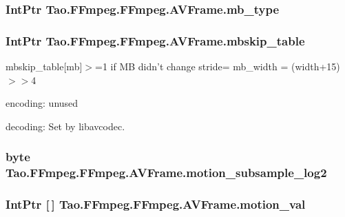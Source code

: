 \hypertarget{struct_tao_1_1_f_fmpeg_1_1_f_fmpeg_1_1_a_v_frame_a3cbf839d220e4c2fbdbe0400ad34c182}{
\subsubsection[{mb\_\-type}]{\setlength{\rightskip}{0pt plus 5cm}IntPtr {\bf Tao.FFmpeg.FFmpeg.AVFrame.mb\_\-type}}}
\label{struct_tao_1_1_f_fmpeg_1_1_f_fmpeg_1_1_a_v_frame_a3cbf839d220e4c2fbdbe0400ad34c182}
\hypertarget{struct_tao_1_1_f_fmpeg_1_1_f_fmpeg_1_1_a_v_frame_acff72d0cc65f263a4840f51cf28e6499}{
\subsubsection[{mbskip\_\-table}]{\setlength{\rightskip}{0pt plus 5cm}IntPtr {\bf Tao.FFmpeg.FFmpeg.AVFrame.mbskip\_\-table}}}
\label{struct_tao_1_1_f_fmpeg_1_1_f_fmpeg_1_1_a_v_frame_acff72d0cc65f263a4840f51cf28e6499}
mbskip\_\-table\mbox{[}mb\mbox{]}$>$=1 if MB didn't change stride= mb\_\-width = (width+15)$>$$>$4
\begin{DoxyItemize}
\item encoding: unused
\item decoding: Set by libavcodec. 
\end{DoxyItemize}\hypertarget{struct_tao_1_1_f_fmpeg_1_1_f_fmpeg_1_1_a_v_frame_aff7134ee6d609c50165689bf45834619}{
\subsubsection[{motion\_\-subsample\_\-log2}]{\setlength{\rightskip}{0pt plus 5cm}byte {\bf Tao.FFmpeg.FFmpeg.AVFrame.motion\_\-subsample\_\-log2}}}
\label{struct_tao_1_1_f_fmpeg_1_1_f_fmpeg_1_1_a_v_frame_aff7134ee6d609c50165689bf45834619}
\hypertarget{struct_tao_1_1_f_fmpeg_1_1_f_fmpeg_1_1_a_v_frame_a3030302698ee47779adfa2114fcb952c}{
\subsubsection[{motion\_\-val}]{\setlength{\rightskip}{0pt plus 5cm}IntPtr \mbox{[}$\,$\mbox{]} {\bf Tao.FFmpeg.FFmpeg.AVFrame.motion\_\-val}}}
\label{struct_tao_1_1_f_fmpeg_1_1_f_fmpeg_1_1_a_v_frame_a3030302698ee47779adfa2114fcb952c}


